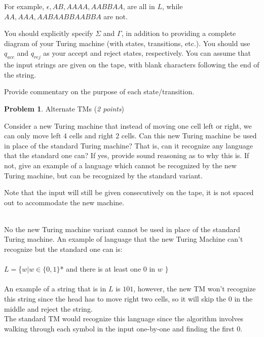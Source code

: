 \documentclass[11pt]{article}
\theoremstyle{definition}
\theoremstyle{theorem}
\newtheorem{prob}{Problem}
\newcommand{\solution}{\medskip\noindent{\color{blue}\textbf{Solution:}}}
\begin{document}
For example, $ \epsilon, AB, AAAA, AABBAA$, are all in $L$, while $AA, AAA, AABAABBAABBA$ are not.

You should explicitly specify $\Sigma$ and $\Gamma$, in addition to providing a complete diagram of your Turing machine (with states, transitions, etc.). You should use $q_{acc}$ and $q_{rej}$ as your accept and reject states, respectively. You can assume that the input strings are given on the tape, with blank characters following the end of the string.

Provide commentary on the purpose of each state/transition.

\solution






\newpage

\begin{prob} Alternate TMs (\emph{2 points})\end{prob}

Consider a new Turing machine that instead of moving one cell left or right, we can only move left 4 cells and right 2 cells. Can this new Turing machine be used in place of the standard Turing machine? That is, can it recognize any language that the standard one can? If yes, provide sound reasoning as to why this is. If not, give an example of a language which cannot be recognized by the new Turing machine, but can be recognized by the standard variant.

Note that the input will still be given consecutively on the tape, it is not spaced out to accommodate the new machine.

\solution \\
No the new Turing machine variant cannot be used in place of the standard Turing machine. An example of language that the new Turing Machine can't recognize but the standard one can is: \\ ~ \\

$L = $\{$ w | w \in \{0, 1\}$* and there is at least one 0 in $w$ $\}$ \\~\\

An example of a string that is in $L$ is $101$, however, the new TM won't recognize this string since the head has to move right two cells, so it will skip the 0 in the middle and reject the string. \\ 
The standard TM would recognize this language since the algorithm involves walking through each symbol in the input one-by-one and finding the first 0. 
\end{document}
